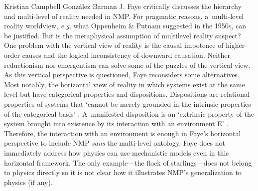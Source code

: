 \begin{recengenv}{Kristian Campbell González Barman}
J. Faye critically discusses the hierarchy and multi-level of reality needed in NMP. For pragmatic reasons, a~multi-level reality worldview, \textit{e.g.} what Oppenheim \& Putnam
\parencite*[][]{oppenheim_unity_1958} %
 suggested in the 1950s, can be justified. But is the metaphysical assumption of multilevel reality suspect? One problem with the vertical view of reality is the causal impotence of higher-order causes and the logical inconsistency of downward causation. Neither reductionism nor emergentism can solve some of the puzzles of the vertical view. As this vertical perspective is questioned, Faye reconsiders some alternatives. Most notably, the horizontal view of reality in which systems exist at the same level but have categorical properties and dispositions. Dispositions are relational properties of systems that ‘cannot be merely grounded in the intrinsic properties of the categorical basis' 
\parencite*[][p.177]{falkenburg_mechanistic_2019}. %
 A~manifested disposition is an ‘extrinsic property of the system brought into existence by its interaction with an environment E' 
\parencite*[][p.179]{falkenburg_mechanistic_2019}. %
 Therefore, the interaction with an environment is enough in Faye's horizontal perspective to include NMP \textit{sans} the multi-level ontology. Faye does not immediately address how physics can use mechanistic models even in this horizontal framework. The only example---the flock of starlings---does not belong to physics directly so it is not clear how it illustrates NMP's generalization to physics (if any).


\end{recengenv}
